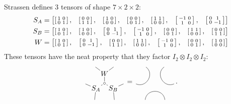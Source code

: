 Strassen defines 3 tensors of shape $7\times 2\times 2$:
\begin{align*}
   \renewcommand*{\arraystretch}{1}
S_A &= \begin{bmatrix}
\smat{1 & 0\\0 & 1}, &
\smat{0 & 0\\1 & 1}, &
\smat{1 & 0\\0 & 0}, &
\smat{0 & 0\\0 & 1}, &
\smat{1 & 1\\0 & 0}, &
\smat{-1 & 0\\1 & 0}, &
\smat{0 & 1\\0 & -1}
\end{bmatrix}
\\
S_B &= \begin{bmatrix}
\smat{1 & 0\\0 & 1}, &
\smat{1 & 0\\0 & 0}, &
\smat{0 & 1\\0 & -1}, &
\smat{-1 & 0\\1 & 0}, &
\smat{0 & 0\\0 & 1}, &
\smat{1 & 1\\0 & 0}, &
\smat{0 & 0\\1 & 1}
\end{bmatrix}
\\
W &= \begin{bmatrix}
\smat{1 & 0\\0 & 1}, &
\smat{0 & 1\\0 & -1}, &
\smat{0 & 0\\1 & 1}, &
\smat{1 & 1\\0 & 0}, &
\smat{-1 & 0\\1 & 0}, &
\smat{0 & 0\\0 & 1}, &
\smat{1 & 0\\0 & 0}
\end{bmatrix}
\end{align*}
These tensors have the neat property that they factor $I_2\otimes I_2\otimes I_2$:
\[
\begin{tikzpicture}[inner sep=1pt, baseline=.0em]
    \node (m) at (0,0) {$\sbullet$};
    \node (W) at (0,.5) {$W$};
    \node (SB) at (-30:.5) {$S_B$};
    \node (SA) at (-150:.5) {$S_A$};
    \node (w1) at (60:1) {};
    \node (w2) at (120:1) {};
    \node (sa1) at (-120:1) {};
    \node (sa2) at (-180:1) {};
    \node (sb1) at (-0:1) {};
    \node (sb2) at (-60:1) {};
    \draw (m) -- (W);
    \draw (m) -- (SA);
    \draw (m) -- (SB);
    \draw (W) -- (w1) {};
    \draw (W) -- (w2) {};
    \draw (SB) -- (sb1) {};
    \draw (SB) -- (sb2) {};
    \draw (SA) -- (sa1) {};
    \draw (SA) -- (sa2) {};
\end{tikzpicture}
=
\begin{tikzpicture}[inner sep=1pt, baseline=.0em]
    \node (m) at (0,0) {};
    \node (W) at (0,.5) {};
    \node (SB) at (-30:.5) {};
    \node (SA) at (-150:.5) {};
    \node (w1) at (60:1) {};
    \node (w2) at (120:1) {};
    \node (sa1) at (-120:1) {};
    \node (sa2) at (-180:1) {};
    \node (sb1) at (-0:1) {};
    \node (sb2) at (-60:1) {};
    \draw (sa2) .. controls (SA) and (W) .. (w2);
    \draw (sa1) .. controls (SA) and (SB) .. (sb2);
    \draw (sb1) .. controls (SB) and (W) .. (w1);
\end{tikzpicture}
.
\]
